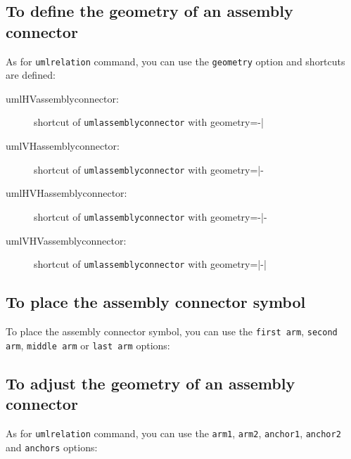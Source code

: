 \documentclass[a4paper,11pt]{report}
\begin{document}
\subsection{To define the geometry of an assembly connector}

As for {\tt umlrelation} command, you can use the {\tt geometry} option and shortcuts are defined:

\begin{description}
\item[umlHVassemblyconnector:] shortcut of {\tt umlassemblyconnector} with geometry=-|
\item[umlVHassemblyconnector:] shortcut of {\tt umlassemblyconnector} with geometry=|-
\item[umlHVHassemblyconnector:] shortcut of {\tt umlassemblyconnector} with geometry=-|-
\item[umlVHVassemblyconnector:] shortcut of {\tt umlassemblyconnector} with geometry=|-|
\end{description}

\subsection{To place the assembly connector symbol}

To place the assembly connector symbol, you can use the {\tt first arm}, {\tt second arm}, {\tt middle arm} or {\tt last arm} options:

\medskip

\begin{minipage}{0.45\textwidth}

\end{minipage}
\begin{minipage}{0.55\textwidth}
\begin{center}
\end{center}
\end{minipage}

\subsection{To adjust the geometry of an assembly connector}

As for {\tt umlrelation} command, you can use the {\tt arm1}, {\tt arm2}, {\tt anchor1}, {\tt anchor2} and {\tt anchors} options:

\medskip

\begin{minipage}{0.45\textwidth}

\end{minipage}
\begin{minipage}{0.55\textwidth}
\begin{center}
\end{center}
\end{minipage}
\end{document}
